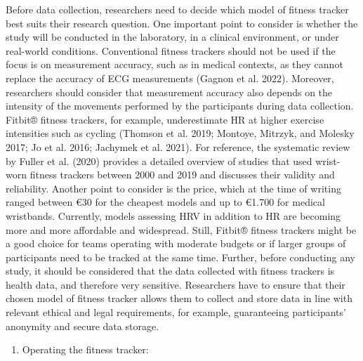 \documentclass[preprint,
3p]{elsarticle} %
\providecommand{\tightlist}{%
  \setlength{\itemsep}{0pt}\setlength{\parskip}{0pt}}
\begin{document}
Before data collection, researchers need to decide which model of
fitness tracker best suits their research question. One important point
to consider is whether the study will be conducted in the laboratory, in
a clinical environment, or under real-world conditions. Conventional
fitness trackers should not be used if the focus is on measurement
accuracy, such as in medical contexts, as they cannot replace the
accuracy of ECG measurements (Gagnon et al. 2022). Moreover, researchers
should consider that measurement accuracy also depends on the intensity
of the movements performed by the participants during data collection.
Fitbit® fitness trackers, for example, underestimate HR at higher
exercise intensities such as cycling (Thomson et al. 2019; Montoye,
Mitrzyk, and Molesky 2017; Jo et al. 2016; Jachymek et al. 2021). For
reference, the systematic review by Fuller et al. (2020) provides a
detailed overview of studies that used wrist-worn fitness trackers
between 2000 and 2019 and discusses their validity and reliability.
Another point to consider is the price, which at the time of writing
ranged between €30 for the cheapest models and up to €1.700 for medical
wristbands. Currently, models assessing HRV in addition to HR are
becoming more and more affordable and widespread. Still, Fitbit® fitness
trackers might be a good choice for teams operating with moderate
budgets or if larger groups of participants need to be tracked at the
same time. Further, before conducting any study, it should be considered
that the data collected with fitness trackers is health data, and
therefore very sensitive. Researchers have to ensure that their chosen
model of fitness tracker allows them to collect and store data in line
with relevant ethical and legal requirements, for example, guaranteeing
participants' anonymity and secure data storage.

\begin{enumerate}
\def\labelenumi{\arabic{enumi})}
\setcounter{enumi}{1}
\tightlist
\item
  Operating the fitness tracker:
\end{enumerate}
\end{document}
